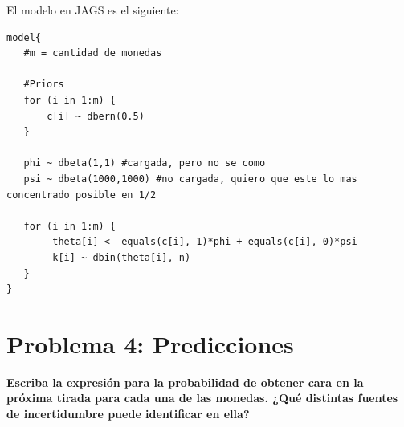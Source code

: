 El modelo en JAGS es el siguiente:

\begin{verbatim}
model{
   #m = cantidad de monedas

   #Priors
   for (i in 1:m) {
   	   c[i] ~ dbern(0.5)
   }
   
   phi ~ dbeta(1,1) #cargada, pero no se como
   psi ~ dbeta(1000,1000) #no cargada, quiero que este lo mas concentrado posible en 1/2

   for (i in 1:m) {
   		theta[i] <- equals(c[i], 1)*phi + equals(c[i], 0)*psi
   		k[i] ~ dbin(theta[i], n)
   }
}
\end{verbatim}

\newpage

\section{Problema 4: Predicciones}

\textbf{Escriba la expresión para la probabilidad de obtener cara en la próxima tirada para cada una de las monedas. 
¿Qué distintas fuentes de incertidumbre puede identificar en ella?}